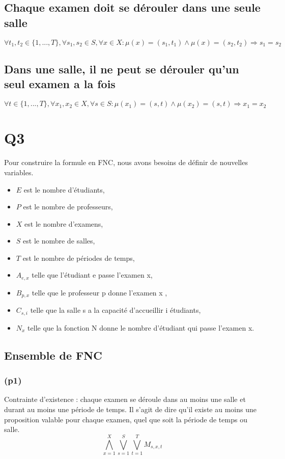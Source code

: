 \documentclass[a4paper,11pt]{article}
\begin{document}
\subsection {Chaque examen doit se dérouler dans une seule salle}
\begin{displaymath}
\forall t_{1}, t_{2} \in \{1,...,T\},\forall s_{1},s_{2} \in S, \forall x \in X : \mu(x) = (s_{1},t_{1}) \wedge \mu(x) = (s_{2},t_{2}) \Rightarrow s_{1} = s_{2}
\end{displaymath}

\subsection {Dans une salle, il ne peut se dérouler qu'un seul examen a la fois}
\begin{displaymath}
\forall t \in \{1,...,T\},\forall x_{1},x_{2} \in X, \forall s \in S : \mu(x_{1}) = (s,t) \wedge \mu(x_{2}) = (s,t) \Rightarrow x_{1} = x_{2}
\end{displaymath}	

\section{Q3}
Pour construire la formule en FNC, nous avons besoins de définir de nouvelles variables.
\begin{itemize}
    \item \(E\) est le nombre d'étudiants,
    \item \(P\) est le nombre de professeurs,
    \item \(X\) est le nombre d'examens,
    \item \(S\) est le nombre de salles,
    \item \(T\) est le nombre de périodes de temps,
	\item \( A_{e,x}\) telle que l'étudiant e passe l'examen x,
	\item \(B_{p,x}\) telle que le professeur p donne l'examen x ,
	\item \(C_{s,i}\) telle que la salle s a la capacité d'accueillir i étudiants,
	\item \(N_{x}\) telle que la fonction N donne le nombre d'étudiant qui passe l'examen x.
\end{itemize}


\subsection{Ensemble de FNC}
\subsubsection{(p1)}
Contrainte d'existence : chaque examen se déroule dans au moins une salle et durant au moins une période de temps.
Il s'agit de dire qu'il existe au moins une proposition valable pour chaque examen, quel que soit la période de temps ou salle.
\begin{displaymath}
	\bigwedge\limits_{x=1}^{X}\bigvee\limits_{s=1}^{S}\bigvee\limits_{t=1}^{T} M_{s,x,t}
\end{displaymath}
\end{document}
